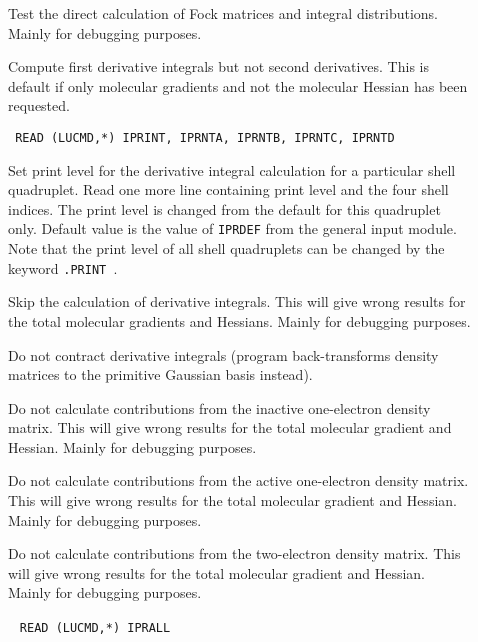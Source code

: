 \begin{description}
\item[] Test the direct calculation of Fock matrices and
integral distributions. Mainly for debugging purposes.

\item[] Compute first derivative integrals but not
second derivatives. This is default if only molecular gradients and
not the molecular Hessian has been requested.

\item[]\verb| |\newline
\verb|READ (LUCMD,*) IPRINT, IPRNTA, IPRNTB, IPRNTC, IPRNTD|

Set print level for the derivative integral calculation for a particular shell
quadruplet.  Read one more line containing print level and the four
shell indices.  The print level is changed from the default
for this quadruplet only. Default value is the value of \verb|IPRDEF|
from the general input module. Note that the print level of all shell
quadruplets can be changed by the keyword \verb|.PRINT |.

\item[] Skip the calculation of derivative integrals.
This will give wrong results for the total molecular gradients and
Hessians. Mainly for debugging purposes.

\item[] Do not contract derivative integrals
(program back-transforms density matrices to the primitive Gaussian
basis instead).

\item[] Do not calculate contributions from the inactive
one-electron density matrix. This will give wrong results for the
total molecular gradient and Hessian. Mainly for debugging purposes.

\item[] Do not calculate contributions from the active
one-electron density matrix. This will give wrong results for the
total molecular gradient and Hessian. Mainly for debugging purposes.

\item[] Do not calculate contributions from the two-electron
density matrix. This will give wrong results for the total molecular
gradient and Hessian. Mainly for debugging purposes.

\item[]\verb| |\newline
\verb|READ (LUCMD,*) IPRALL|


\end{description}
